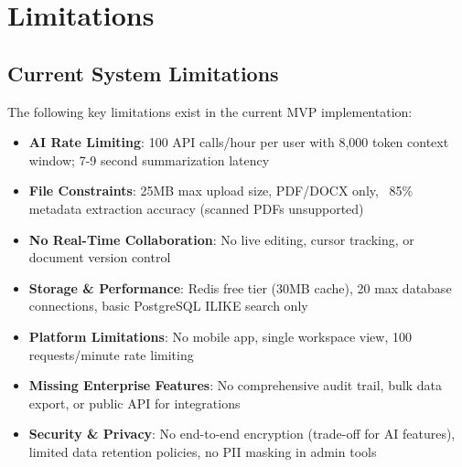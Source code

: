 \chapter{Limitations}
\label{ch:limitations}

\section{Current System Limitations}
\label{sec:limitations-overview}

The following key limitations exist in the current MVP implementation:

\begin{itemize}
    \item \textbf{AI Rate Limiting}: 100 API calls/hour per user with 8,000 token context window; 7-9 second summarization latency
    
    \item \textbf{File Constraints}: 25MB max upload size, PDF/DOCX only, ~85\% metadata extraction accuracy (scanned PDFs unsupported)
    
    \item \textbf{No Real-Time Collaboration}: No live editing, cursor tracking, or document version control
    
    \item \textbf{Storage \& Performance}: Redis free tier (30MB cache), 20 max database connections, basic PostgreSQL ILIKE search only
    
    \item \textbf{Platform Limitations}: No mobile app, single workspace view, 100 requests/minute rate limiting
    
    \item \textbf{Missing Enterprise Features}: No comprehensive audit trail, bulk data export, or public API for integrations
    
    \item \textbf{Security \& Privacy}: No end-to-end encryption (trade-off for AI features), limited data retention policies, no PII masking in admin tools
\end{itemize}
